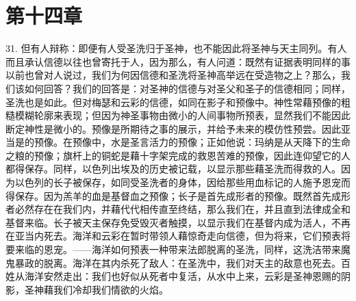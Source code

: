 \section{第十四章}

\par

31. 但有人辩称：即便有人受圣洗归于圣神，也不能因此将圣神与天主同列。有人而且承认信德以往也曾寄托于人，因为那么，有人问道：既然有证据表明同样的事以前也曾对人说过，我们为何因信德和圣洗将圣神高举远在受造物之上？那么，我们该如何回答？我们的回答是：对圣神的信德与对圣父和圣子的信德相同；同样，圣洗也是如此。但对梅瑟和云彩的信德，如同在影子和预像中。神性常藉预像的粗糙模糊轮廓来表现；但因为神圣事物由微小的人间事物所预表，显然我们不能因此断定神性是微小的。预像是所期待之事的展示，并给予未来的模仿性预尝。因此亚当是的预像。在预像中，水是圣言活力的预像；正如他说：玛纳是从天降下的生命之粮的预像；旗杆上的铜蛇是藉十字架完成的救恩苦难的预像，因此连仰望它的人都得保存。同样，以色列出埃及的历史被记载，以显示那些藉圣洗而得救的人。因为以色列的长子被保存，如同受圣洗者的身体，因给那些用血标记的人施予恩宠而得保存。因为羔羊的血是基督血之预像；长子是首先成形者的预像。既然首先成形者必然存在在我们内，并藉代代相传直至终结，那么我们在，并且直到法律成全和基督来临。长子被天主保存免受毁灭者触摸，以显示我们在基督内成为活人，不再在亚当内死去。海洋和云彩在暂时带领人藉惊奇走向信德，但为将来，它们预表将要来临的恩宠。——海洋如何预表一种带来法郎脱离的圣洗，同样，这洗洁带来魔鬼暴政的脱离。海洋在其内杀死了敌人：在圣洗中，我们对天主的敌意也死去。百姓从海洋安然走出：我们也好似从死者中复活，从水中上来，云彩是圣神恩赐的阴影，圣神藉我们冷却我们情欲的火焰。\par

